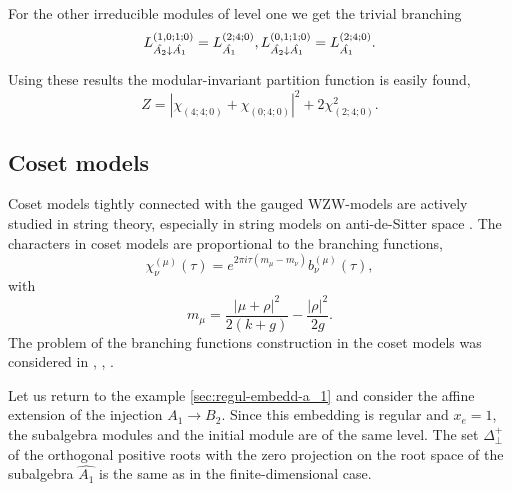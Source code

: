 \documentclass[12pt]{iopart}
\theoremstyle{definition}
\theoremstyle{definition}
\theoremstyle{definition}
\theoremstyle{definition}
\begin{document}
For the other irreducible modules of level one  we get the trivial
branching
\begin{equation*}
  \label{eq:44}
   L^{(1,0;1;0)}_{\hat{A_2}\downarrow \hat{A_1}}= L_{\hat{A_1}}^{(2;4;0)},\\
   L^{(0,1;1;0)}_{\hat{A_2}\downarrow \hat{A_1}}= L_{\hat{A_1}}^{(2;4;0)}.
\end{equation*}

Using these results the modular-invariant partition function is easily found,
\begin{equation*}
  \label{eq:45}
  Z=\left|\chi_{(4;4;0)}+\chi_{(0;4;0)}\right|^2+2\chi_{(2;4;0)}^2.
\end{equation*}

\subsection{Coset models}
\label{sec:coset-models}

Coset models \cite{Goddard198588} tightly connected with the gauged WZW-models are actively studied
in string theory, especially in string models on anti-de-Sitter space
\cite{Maldacena:2000hw,Maldacena:2000kv,Maldacena:2001km,Maldacena:2001ky,Aharony:1999ti}.
The characters in coset models are proportional to the branching functions,
\begin{equation}
  \label{eq:31}
  \chi^{(\mu)}_{\nu}(\tau)=e^{2\pi i \tau (m_{\mu}-m_{\nu})} b^{(\mu)}_{\nu}(\tau),
\end{equation}
with
\begin{equation*}
  \label{eq:46}
  m_{\mu}=\frac{\left|\mu+\rho\right|^2}{2(k+g)}-\frac{\left|\rho\right|^2}{2g}.
\end{equation*}
The problem of the branching functions construction in the coset models was considered
in  \cite{Dunbar:1992gh}, \cite{Hwang:1994yr}, \cite{lu1994branching}.

Let us return to the example \ref{sec:regul-embedd-a_1} and consider the affine extension of the injection
$A_1 \longrightarrow B_2$.
Since this embedding is regular and $x_e=1$, the subalgebra modules and the initial module are of the same level.
The set $\Delta^{+}_{\bot}$ of the orthogonal positive roots with the zero projection
on the root space of the subalgebra $\hat{A_1}$ is the same as in the finite-dimensional case.
\end{document}

